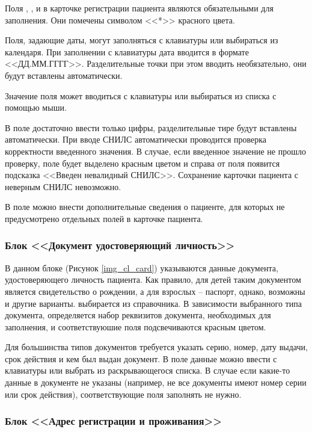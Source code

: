 Поля , ,  и  в карточке регистрации пациента являются обязательными для заполнения. Они помечены символом <<*>> красного цвета.

Поля, задающие даты, могут заполняться с клавиатуры или выбираться из календаря. При заполнении с клавиатуры дата вводится в формате <<ДД.ММ.ГГГГ>>. Разделительные точки при этом вводить необязательно, они будут вставлены автоматически.

Значение поля  может вводиться с клавиатуры или выбираться из списка с помощью мыши. 

В поле  достаточно ввести только цифры, разделительные тире будут вставлены автоматически. При вводе СНИЛС автоматически проводится проверка корректности введенного значения. В случае, если введенное значение не прошло проверку, поле будет выделено красным цветом и справа от поля появится подсказка <<Введен невалидный СНИЛС>>. Сохранение карточки пациента с неверным СНИЛС невозможно.

В поле  можно внести дополнительные сведения о пациенте, для которых не предусмотрено отдельных полей в карточке пациента. 
 
\subsubsection{Блок <<Документ удостоверяющий личность>>}

В данном блоке (Рисунок \ref{img_cl_card}) указываются данные документа, удостоверяющего личность пациента. Как правило, для детей таким документом является свидетельство о рождении, а для взрослых – паспорт, однако, возможны и другие варианты.  выбирается из справочника. В зависимости выбранного типа документа, определяется набор реквизитов документа, необходимых для заполнения, и соответствуюшие поля подсвечиваются красным цветом. 

Для большинства типов документов требуется указать серию, номер, дату выдачи, срок действия и кем был выдан документ. В поле  данные можно ввести с клавиатуры или выбрать из раскрывающегося списка. В случае если какие-то данные в документе не указаны (например, не все документы имеют номер серии или срок действия), соответствующие поля заполнять не нужно.

\subsubsection{Блок <<Адрес регистрации и проживания>>}


